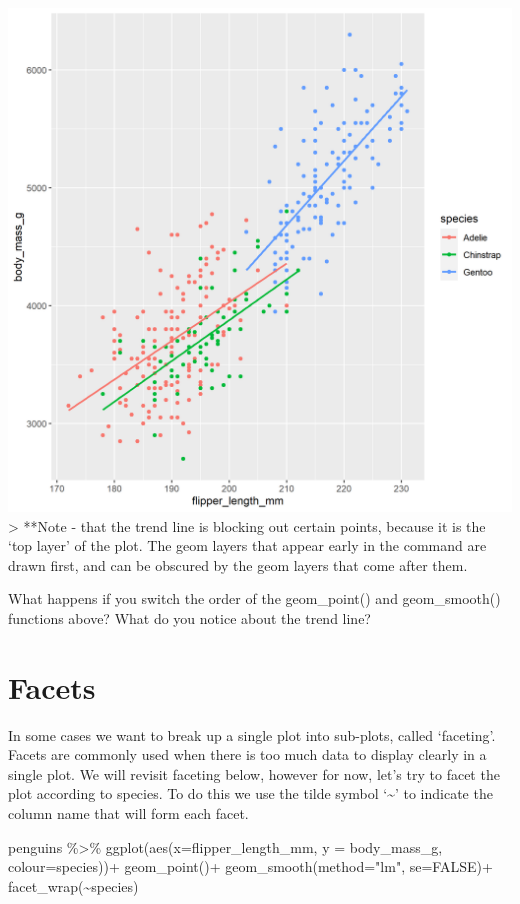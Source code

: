 \documentclass[
]{book}
\makeatletter
\newenvironment{Shaded}{\begin{snugshade}}{\end{snugshade}}
\newcommand{\AttributeTok}[1]{\textcolor[rgb]{0.77,0.63,0.00}{#1}}
\newcommand{\ConstantTok}[1]{\textcolor[rgb]{0.00,0.00,0.00}{#1}}
\newcommand{\FunctionTok}[1]{\textcolor[rgb]{0.00,0.00,0.00}{#1}}
\newcommand{\NormalTok}[1]{#1}
\newcommand{\SpecialCharTok}[1]{\textcolor[rgb]{0.00,0.00,0.00}{#1}}
\newcommand{\StringTok}[1]{\textcolor[rgb]{0.31,0.60,0.02}{#1}}
\newenvironment{kframe}{%
\medskip{}
\setlength{\fboxsep}{.8em}
 \def\at@end@of@kframe{}%
 \ifinner\ifhmode%
  \def\at@end@of@kframe{\end{minipage}}%
  \begin{minipage}{\columnwidth}%
 \fi\fi%
 \def\FrameCommand##1{\hskip\@totalleftmargin \hskip-\fboxsep
 \colorbox{shadecolor}{##1}\hskip-\fboxsep
     \hskip-\linewidth \hskip-\@totalleftmargin \hskip\columnwidth}%
 \MakeFramed {\advance\hsize-\width
   \@totalleftmargin\z@ \linewidth\hsize
   \@setminipage}}%
 {\par\unskip\endMakeFramed%
 \at@end@of@kframe}
\newenvironment{block}[1]
  {
  \begin{itemize}
  \renewcommand{\labelitemi}{
    \raisebox{-.7\height}[0pt][0pt]{
      {\setkeys{Gin}{width=3em,keepaspectratio}\texttt{[image: images/\#1]}}
    }
  }
  \setlength{\fboxsep}{1em}
  \begin{kframe}
  \item
  }
  {
  \end{kframe}
  \end{itemize}
  }
\newenvironment{rmdquestion}
  {\begin{block}{question}}
  {\end{block}}
\makeatother
\begin{document}
\includegraphics[width=0.8\linewidth]{images/linearmodel}
\textgreater{} **Note - that the trend line is blocking out certain points, because it is the `top layer' of the plot. The geom layers that appear early in the command are drawn first, and can be obscured by the geom layers that come after them.

\begin{rmdquestion}
What happens if you switch the order of the geom\_point() and
geom\_smooth() functions above? What do you notice about the trend line?
\end{rmdquestion}

\hypertarget{facets}{%
\section{Facets}\label{facets}}

In some cases we want to break up a single plot into sub-plots, called `faceting'. Facets are commonly used when there is too much data to display clearly in a single plot. We will revisit faceting below, however for now, let's try to facet the plot according to species.
To do this we use the tilde symbol `\textasciitilde{}' to indicate the column name that will form each facet.

\begin{Shaded}
\begin{Highlighting}[]
\NormalTok{penguins }\SpecialCharTok{\%\textgreater{}\%} 
  \FunctionTok{ggplot}\NormalTok{(}\FunctionTok{aes}\NormalTok{(}\AttributeTok{x=}\NormalTok{flipper\_length\_mm, }
             \AttributeTok{y =}\NormalTok{ body\_mass\_g,}
             \AttributeTok{colour=}\NormalTok{species))}\SpecialCharTok{+} 
  \FunctionTok{geom\_point}\NormalTok{()}\SpecialCharTok{+}
  \FunctionTok{geom\_smooth}\NormalTok{(}\AttributeTok{method=}\StringTok{"lm"}\NormalTok{,    }
              \AttributeTok{se=}\ConstantTok{FALSE}\NormalTok{)}\SpecialCharTok{+}
  \FunctionTok{facet\_wrap}\NormalTok{(}\SpecialCharTok{\textasciitilde{}}\NormalTok{species)}
\end{Highlighting}
\end{Shaded}
\end{document}

